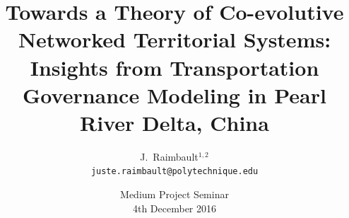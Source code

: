 \documentclass[english,11pt]{beamer}
\begin{document}
\title{Towards a Theory of Co-evolutive Networked Territorial Systems: Insights from Transportation Governance Modeling in Pearl River Delta, China}

\author{J.~Raimbault$^{1,2}$\\
\texttt{juste.raimbault@polytechnique.edu}
}




\date{Medium Project Seminar\\\smallskip
4th December 2016
}


{




\frame{\maketitle}

}




\end{document}
